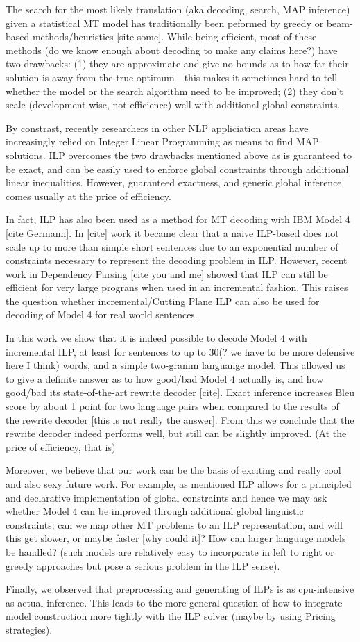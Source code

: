 The search for the most likely translation (aka decoding, search,
MAP inference) given a statistical MT model has traditionally been
peformed by greedy or beam-based methods/heuristics {[}site some{]}.
While being efficient, most of these methods (do we know enough about
decoding to make any claims here?) have two drawbacks: (1) they are
approximate and give no bounds as to how far their solution is away
from the true optimum---this makes it sometimes hard to tell whether
the model or the search algorithm need to be improved; (2) they don't
scale (development-wise, not efficience) well with additional global
constraints. 

By constrast, recently researchers in other NLP appliciation areas
have increasingly relied on Integer Linear Programming as means to
find MAP solutions. ILP overcomes the two drawbacks mentioned above
as is guaranteed to be exact, and can be easily used to enforce global
constraints through additional linear inequalities. However, guaranteed
exactness, and generic global inference comes usually at the price
of efficiency. 

In fact, ILP has also been used as a method for MT decoding with IBM
Model 4 {[}cite Germann{]}. In {[}cite{]} work it became clear that
a naive ILP-based does not scale up to more than simple short sentences
due to an exponential number of constraints necessary to represent
the decoding problem in ILP. However, recent work in Dependency Parsing
{[}cite you and me{]} showed that ILP can still be efficient for very
large prograns when used in an incremental fashion. This raises the
question whether incremental/Cutting Plane ILP can also be used for
decoding of Model 4 for real world sentences. 

In this work we show that it is indeed possible to decode Model 4
with incremental ILP, at least for sentences to up to 30(? we have
to be more defensive here I think) words, and a simple two-gramm languange
model. This allowed us to give a definite answer as to how good/bad
Model 4 actually is, and how good/bad its state-of-the-art rewrite
decoder {[}cite{]}. Exact inference increases Bleu score by about
1 point for two language pairs when compared to the results of the
rewrite decoder {[}this is not really the answer{]}. From this we
conclude that the rewrite decoder indeed performs well, but still
can be slightly improved. (At the price of efficiency, that is)

Moreover, we believe that our work can be the basis of exciting and
really cool and also sexy future work. For example, as mentioned ILP
allows for a principled and declarative implementation of global constraints
and hence we may ask whether Model 4 can be improved through additional
global linguistic constraints; can we map other MT problems to an
ILP representation, and will this get slower, or maybe faster {[}why
could it{]}? How can larger language models be handled? (such models
are relatively easy to incorporate in left to right or greedy approaches
but pose a serious problem in the ILP sense). 

Finally, we observed that preprocessing and generating of ILPs is
as cpu-intensive as actual inference. This leads to the more general
question of how to integrate model construction more tightly with
the ILP solver (maybe by using Pricing strategies).